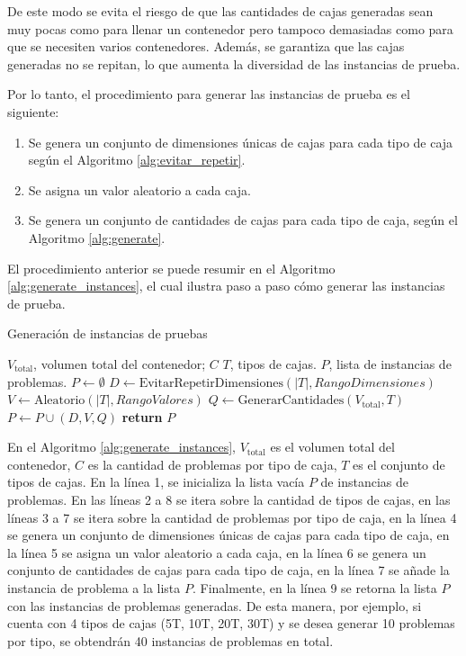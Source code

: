 De este modo se evita el riesgo de que las cantidades de cajas generadas sean muy pocas como para llenar un contenedor pero tampoco demasiadas como para que se necesiten varios contenedores. Además, se garantiza que las cajas generadas no se repitan, lo que aumenta la diversidad de las instancias de prueba.

Por lo tanto, el procedimiento para generar las instancias de prueba es el siguiente:

\begin{enumerate}
    \item Se genera un conjunto de dimensiones únicas de cajas para cada tipo de caja según el Algoritmo \ref{alg:evitar_repetir}.
    \item Se asigna un valor aleatorio a cada caja.
    \item Se genera un conjunto de cantidades de cajas para cada tipo de caja, según el Algoritmo \ref{alg:generate}.
\end{enumerate}

El procedimiento anterior se puede resumir en el Algoritmo \ref{alg:generate_instances}, el cual ilustra paso a paso cómo generar las instancias de prueba.

\begin{algorithm}[H]
    \caption{Generación de instancias de pruebas}
    \label{alg:generate_instances}
    \begin{algorithmic}[1]
        \Require $V_{\text{total}}$, volumen total del contenedor; $C$  $T$, tipos de cajas.
        \Ensure $P$, lista de instancias de problemas.
        \State $P \gets \emptyset$
        \State $D \gets \text{EvitarRepetirDimensiones}(|T|, RangoDimensiones)$
        \State $V \gets \text{Aleatorio}(|T|, RangoValores)$
        \State $Q \gets \text{GenerarCantidades}(V_{\text{total}}, T)$
        \State $P \gets P \cup (D, V, Q)$
        \EndFor
        \EndFor
        \State \textbf{return} $P$
    \end{algorithmic}
\end{algorithm}

En el Algoritmo \ref{alg:generate_instances}, $V_{\text{total}}$ es el volumen total del contenedor, $C$ es la cantidad de problemas por tipo de caja, $T$ es el conjunto de tipos de cajas. En la línea 1, se inicializa la lista vacía $P$ de instancias de problemas. En las líneas 2 a 8 se itera sobre la cantidad de tipos de cajas, en las líneas 3 a 7 se itera sobre la cantidad de problemas por tipo de caja, en la línea 4 se genera un conjunto de dimensiones únicas de cajas para cada tipo de caja, en la línea 5 se asigna un valor aleatorio a cada caja, en la línea 6 se genera un conjunto de cantidades de cajas para cada tipo de caja, en la línea 7 se añade la instancia de problema a la lista $P$. Finalmente, en la línea 9 se retorna la lista $P$ con las instancias de problemas generadas. De esta manera, por ejemplo, si cuenta con 4 tipos de cajas (5T, 10T, 20T, 30T) y se desea generar 10 problemas por tipo, se obtendrán 40 instancias de problemas en total.

